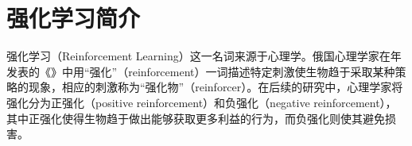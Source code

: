 \section{强化学习简介}
强化学习（Reinforcement Learning）这一名词来源于心理学。俄国心理学家\citeauthor{pavlovConditionedReflexesInvestigation1927}在\citeyear{pavlovConditionedReflexesInvestigation1927}年发表的《》中用“强化”（reinforcement）一词描述特定刺激使生物趋于采取某种策略的现象，相应的刺激称为“强化物”（reinforcer）\cite{pavlovConditionedReflexesInvestigation1927}。在后续的研究中，心理学家将强化分为正强化（positive reinforcement）和负强化（negative reinforcement），其中正强化使得生物趋于做出能够获取更多利益的行为，而负强化则使其避免损害\cite{michaelPositiveNegativeReinforcement1975}。




